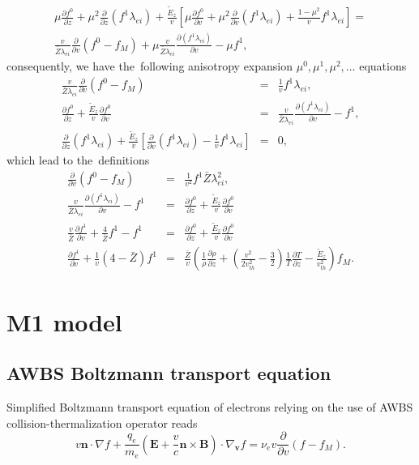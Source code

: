 \documentclass[preprint,12pt]{elsarticle}
\newcommand{\pdv}[2]{\frac{\partial{#1}}{\partial{#2}}}
\newcommand{\vect}[1]{\boldsymbol{#1}}
\newcommand{\mfpei}{\lambda_{ei}}
\newcommand{\Zbar}{\bar{Z}}
\newcommand{\nue}{\nu_{e}}
\newcommand{\vmag}{v}
\newcommand{\vth}{v_{th}}
\newcommand{\vn}{\vect{n}}
\newcommand{\E}{\vect{E}}
\newcommand{\B}{\vect{B}}
\newcommand{\qe}{q_e}
\newcommand{\me}{m_e}
\newcommand{\fM}{f_M}
\newcounter{bla}
\begin{document}
\begin{multline}
  \mu\pdv{f^0}{z} + \mu^2 \pdv{}{z}\left(f^1 \mfpei \right)
  + \frac{\tilde{E}_z}{\vmag} \left[ \mu \pdv{f^0}{\vmag} 
  + \mu^2 \pdv{}{\vmag} \left( f^1 \mfpei \right) 
  + \frac{1 - \mu^2}{\vmag}f^1 \mfpei
  \right] 
  =\\
  \frac{\vmag}{\Zbar\mfpei}\pdv{}{\vmag}
  \left( f^0 -\fM\right)
  + \mu\frac{\vmag}{\Zbar\mfpei}\pdv{\left(f^1 \mfpei\right)}{\vmag} 
  - \mu f^1 ,
  \label{eq:AWBS_spherical}
\end{multline}
consequently, we have the~following anisotropy expansion 
$\mu^0, \mu^1, \mu^2, ...$ equations
\begin{eqnarray}
  \frac{\vmag}{\Zbar\mfpei}\pdv{}{\vmag}
  \left( f^0 -\fM\right) &=& \frac{1}{\vmag}f^1 \mfpei , 
  \nonumber \\
  \pdv{f^0}{z} + \frac{\tilde{E}_z}{\vmag}\pdv{f^0}{\vmag} &=& 
  \frac{\vmag}{\Zbar\mfpei}\pdv{\left(f^1 \mfpei\right)}{\vmag}  - f^1 , 
  \nonumber \\ 
  \pdv{}{z}\left(f^1 \mfpei \right) 
  + \frac{\tilde{E}_z}{\vmag} \left[\pdv{}{\vmag} \left( f^1 \mfpei \right)
  - \frac{1}{\vmag}f^1 \mfpei \right] &=& 0 , \nonumber
\end{eqnarray}
which lead to the~definitions
\begin{eqnarray}
  \pdv{}{\vmag}\left( f^0 -\fM\right) &=& \frac{1}{\vmag^2}f^1 \Zbar\mfpei^2 ,
  \label{eq:AWBS_f0} \\
  \frac{\vmag}{\Zbar\mfpei}\pdv{\left(f^1 \mfpei\right)}{\vmag}  - f^1 &=&
  \pdv{f^0}{z} + \frac{\tilde{E}_z}{\vmag}\pdv{f^0}{\vmag}
  \nonumber \\  
  \frac{\vmag}{\Zbar}\pdv{f^1}{\vmag} + \frac{4}{\Zbar}f^1 - f^1 &=&
  \pdv{f^0}{z} + \frac{\tilde{E}_z}{\vmag}\pdv{f^0}{\vmag}
  \nonumber \\
  \pdv{f^1}{\vmag} + \frac{1}{\vmag}(4-\Zbar)f^1
  &=&
  \frac{\Zbar}{\vmag}\left(\frac{1}{\rho}\pdv{\rho}{z} + 
  \left( \frac{\vmag^2}{2 \vth^2} - \frac{3}{2}\right)
  \frac{1}{T}\pdv{T}{z} - \frac{\tilde{E}_z}{\vth^2}\right)\fM .
  \label{eq:AWBS_f1}
\end{eqnarray}

\section{M1 model}\label{sec:m1_model}
\subsection{AWBS Boltzmann transport equation}
Simplified Boltzmann transport equation of electrons relying on the use of AWBS
collision-thermalization operator \cite{AWBS_PRL1986} reads
\begin{equation}
  \vmag\vn\cdot\nabla f + \frac{\qe}{\me}\left( \E + 
  \frac{\vmag}{c}\vn\times\B\right)\cdot\nabla_{\vect{v}} f = \nue \vmag 
  \pdv{}{\vmag}\left( f - \fM\right) .
  \label{eq:AWBS}
\end{equation}
\end{document}
